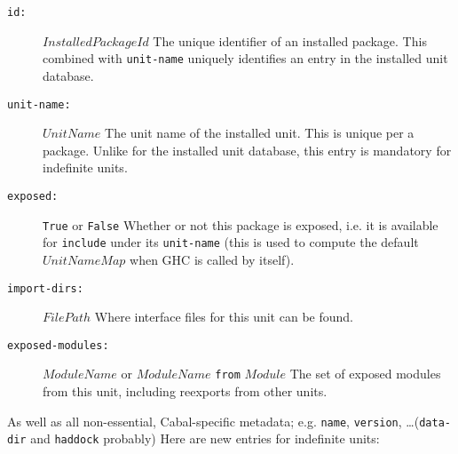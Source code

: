 \documentclass{article}
\newcommand{\I}[1]{\ensuremath{\mathit{#1}}}
\begin{document}
\begin{description}
    \item[\texttt{id:}] \I{InstalledPackageId} \newline
        The unique identifier of an installed package.  This combined
        with \texttt{unit-name} uniquely identifies an entry in the
        installed unit database.
    \item[\texttt{unit-name:}] \I{UnitName} \newline
        The unit name of the installed unit.  This is unique per a package.
        Unlike for the installed unit database, this entry is mandatory for
        indefinite units.
    \item[\texttt{exposed:}] \verb|True| or \verb|False| \newline
        Whether or not this package is exposed, i.e. it is available for
        \verb|include| under its \verb|unit-name| (this is used to compute
        the default \I{UnitNameMap} when GHC is called by itself).
    \item[\texttt{import-dirs:}] \I{FilePath} \newline
        Where interface files for this unit can be found.
    \item[\texttt{exposed-modules:}] \I{ModuleName} or \I{ModuleName} \texttt{from} \I{Module} \newline
        The set of exposed modules from this unit, including reexports from
        other units.
\end{description}
%
As well as all non-essential, Cabal-specific metadata; e.g. \texttt{name}, \texttt{version}, \ldots (\texttt{data-dir} and \texttt{haddock} probably)
Here are new entries for indefinite units:
\end{document}
